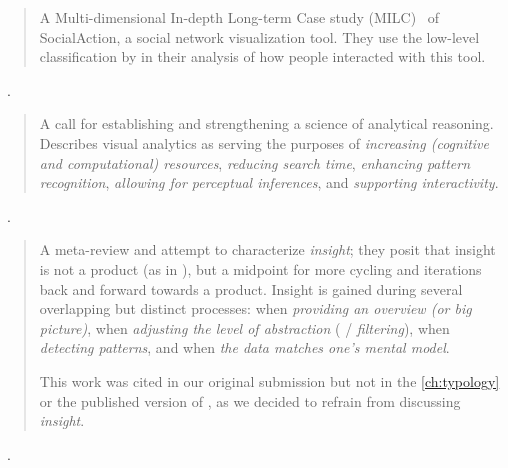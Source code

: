 \begin{quotation}
    \begin{sloppypar}
    A Multi-dimensional In-depth Long-term Case study (MILC)~\cite{Shneiderman2006} of SocialAction, a social network visualization tool.
    They use the low-level classification by \citet{Yi2007} in their analysis of how people interacted with this tool.
    \end{sloppypar}
\end{quotation}

\begin{sloppypar}
~\cite{Thomas2005}. \end{sloppypar}

\begin{quotation}
    A call for establishing and strengthening a science of analytical reasoning.
    Describes visual analytics as serving the purposes of {\it increasing (cognitive and computational) resources}, {\it reducing search time}, {\it enhancing pattern recognition}, {\it allowing for perceptual inferences}, and {\it supporting interactivity}.
\end{quotation}

\begin{sloppypar}
~\cite{Yi2008}. \end{sloppypar}

\begin{quotation}
    A meta-review and attempt to characterize {\it insight}; they posit that insight is not a product (as in \citet{Pirolli2005}), but a midpoint for more cycling and iterations back and forward towards a product. 
    Insight is gained during several overlapping but distinct processes: when {\it providing an overview (or big picture)}, when {\it adjusting the level of abstraction} ( / {\it filtering}), when {\it detecting patterns}, and when {\it the data matches one's mental model}. 
    
    This work was cited in our original submission but not in the \autoref{ch:typology} or the published version of \citet{Brehmer2013}, as we decided to refrain from discussing {\it insight}.
\end{quotation}

\begin{sloppypar}
~\cite{Pirolli2009}. \end{sloppypar}

